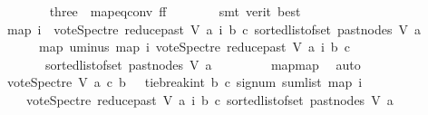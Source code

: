 \begin{isabellebody}
\ \ \ \ \ \ \isamarkupfalse%
\ three\ {}\ map{\isacharunderscore}{\kern0pt}eq{\isacharunderscore}{\kern0pt}conv\ ff\isanewline
\ \ \ \ \ \ \isamarkupfalse%
\ {\isacharparenleft}{\kern0pt}smt\ {\isacharparenleft}{\kern0pt}verit{\isacharcomma}{\kern0pt}\ best{\isacharparenright}{\kern0pt}{\isacharparenright}{\kern0pt}\ \ \ \isanewline
\ \ \ \ \isamarkupfalse%
\ {\isachardoublequoteopen}{\isacharparenleft}{\kern0pt}map\ {\isacharparenleft}{\kern0pt}{\isasymlambda}i{\isachardot}{\kern0pt}\ {\isacharminus}{\kern0pt}\ vote{\isacharunderscore}{\kern0pt}Spectre\ {\isacharparenleft}{\kern0pt}reduce{\isacharunderscore}{\kern0pt}past\ V\ a{\isacharparenright}{\kern0pt}\ i\ b\ c{\isacharparenright}{\kern0pt}\ {\isacharparenleft}{\kern0pt}sorted{\isacharunderscore}{\kern0pt}list{\isacharunderscore}{\kern0pt}of{\isacharunderscore}{\kern0pt}set\ {\isacharparenleft}{\kern0pt}past{\isacharunderscore}{\kern0pt}nodes\ V\ a{\isacharparenright}{\kern0pt}{\isacharparenright}{\kern0pt}{\isacharparenright}{\kern0pt}\isanewline
\ \ \ \ \ {\isacharequal}{\kern0pt}\ {\isacharparenleft}{\kern0pt}map\ uminus\ {\isacharparenleft}{\kern0pt}map\ {\isacharparenleft}{\kern0pt}{\isasymlambda}i{\isachardot}{\kern0pt}\ vote{\isacharunderscore}{\kern0pt}Spectre\ {\isacharparenleft}{\kern0pt}reduce{\isacharunderscore}{\kern0pt}past\ V\ a{\isacharparenright}{\kern0pt}\ i\ b\ c{\isacharparenright}{\kern0pt}\isanewline
\ \ \ \ \ \ \ {\isacharparenleft}{\kern0pt}sorted{\isacharunderscore}{\kern0pt}list{\isacharunderscore}{\kern0pt}of{\isacharunderscore}{\kern0pt}set\ {\isacharparenleft}{\kern0pt}past{\isacharunderscore}{\kern0pt}nodes\ V\ a{\isacharparenright}{\kern0pt}{\isacharparenright}{\kern0pt}{\isacharparenright}{\kern0pt}{\isacharparenright}{\kern0pt}{\isachardoublequoteclose}\ \isanewline
\ \ \ \ \ \ \isamarkupfalse%
\ map{\isacharunderscore}{\kern0pt}map\ \isamarkupfalse%
\ auto\ \ \ \ \ \ \ \isanewline
\ \ \ \ \isamarkupfalse%
\ \isamarkupfalse%
\ {\isachardoublequoteopen}vote{\isacharunderscore}{\kern0pt}Spectre\ V\ a\ c\ b\ {\isacharequal}{\kern0pt}\ {\isacharminus}{\kern0pt}\ {\isacharparenleft}{\kern0pt}tie{\isacharunderscore}{\kern0pt}break{\isacharunderscore}{\kern0pt}int\ b\ c\ {\isacharparenleft}{\kern0pt}signum\ {\isacharparenleft}{\kern0pt}sum{\isacharunderscore}{\kern0pt}list\ {\isacharparenleft}{\kern0pt}map\ {\isacharparenleft}{\kern0pt}{\isasymlambda}i{\isachardot}{\kern0pt}\isanewline
\ \ \ \ {\isacharparenleft}{\kern0pt}vote{\isacharunderscore}{\kern0pt}Spectre\ {\isacharparenleft}{\kern0pt}reduce{\isacharunderscore}{\kern0pt}past\ V\ a{\isacharparenright}{\kern0pt}\ i\ b\ c{\isacharparenright}{\kern0pt}{\isacharparenright}{\kern0pt}\ {\isacharparenleft}{\kern0pt}sorted{\isacharunderscore}{\kern0pt}list{\isacharunderscore}{\kern0pt}of{\isacharunderscore}{\kern0pt}set\ {\isacharparenleft}{\kern0pt}past{\isacharunderscore}{\kern0pt}nodes\ V\ a{\isacharparenright}{\kern0pt}{\isacharparenright}{\kern0pt}{\isacharparenright}{\kern0pt}{\isacharparenright}{\kern0pt}{\isacharparenright}{\kern0pt}{\isacharparenright}{\kern0pt}{\isachardoublequoteclose}\ \isanewline

\end{isabellebody}
